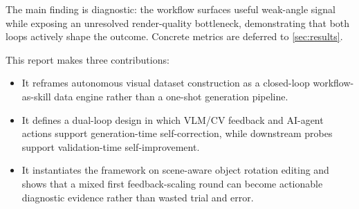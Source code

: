 The main finding is diagnostic: the workflow surfaces useful weak-angle signal while exposing an unresolved render-quality bottleneck, demonstrating that both loops actively shape the outcome. Concrete metrics are deferred to \cref{sec:results}.

This report makes three contributions:
\begin{itemize}[leftmargin=1.5em]
  \item It reframes autonomous visual dataset construction as a closed-loop workflow-as-skill data engine rather than a one-shot generation pipeline.
  \item It defines a dual-loop design in which VLM/CV feedback and AI-agent actions support generation-time self-correction, while downstream probes support validation-time self-improvement.
  \item It instantiates the framework on scene-aware object rotation editing and shows that a mixed first feedback-scaling round can become actionable diagnostic evidence rather than wasted trial and error.
\end{itemize}
